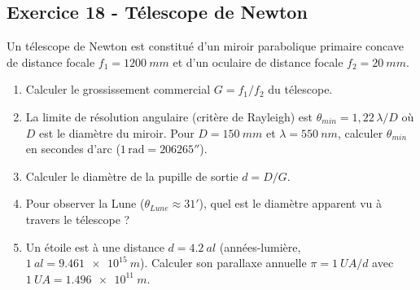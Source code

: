\documentclass[12pt,a4paper]{article}
\begin{document}
\subsection*{Exercice 18 - Télescope de Newton \niveau{\difficile}}

\begin{boiteexercice}
Un télescope de Newton est constitué d'un miroir parabolique primaire concave de distance focale $f_1 = \qty{1200}{mm}$ et d'un oculaire de distance focale $f_2 = \qty{20}{mm}$.
\begin{enumerate}
  \item Calculer le grossissement commercial $G = f_1/f_2$ du télescope.
  \item La limite de résolution angulaire (critère de Rayleigh) est $\theta_{min} = 1{,}22\,\lambda/D$ où $D$ est le diamètre du miroir. Pour $D = \qty{150}{mm}$ et $\lambda = \qty{550}{nm}$, calculer $\theta_{min}$ en secondes d'arc ($1\,\text{rad} = 206265''$).
  \item Calculer le diamètre de la pupille de sortie $d = D/G$.
  \item Pour observer la Lune ($\theta_{Lune} \approx 31'$), quel est le diamètre apparent vu à travers le télescope ?
  \item Un étoile est à une distance $d = \qty{4.2}{al}$ (années-lumière, $\qty{1}{al} = \qty{9.461e15}{m}$). Calculer son parallaxe annuelle $\pi = \qty{1}{UA}/d$ avec $\qty{1}{UA} = \qty{1.496e11}{m}$.
\end{enumerate}
\end{boiteexercice}
\end{document}
